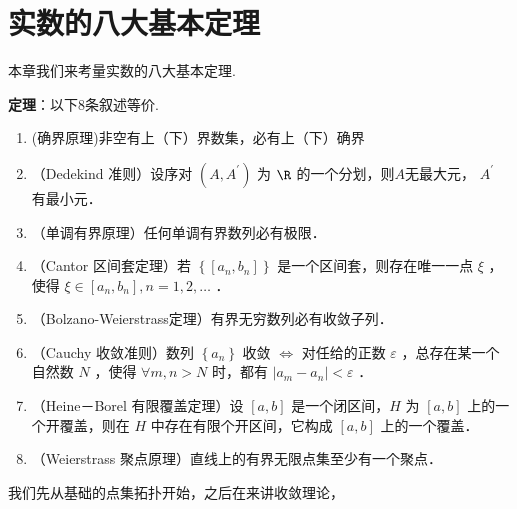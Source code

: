 \chapter{实数的八大基本定理}
本章我们来考量实数的八大基本定理.

\textbf{定理}：以下8条叙述等价.

\begin{enumerate}
	\item (确界原理)非空有上（下）界数集，必有上（下）确界
	\item （Dedekind 准则）设序对 $(A, A^{\prime})$ 为 $\R$ 的一个分划，则$A$无最大元， $A^{\prime}$ 有最小元．
	\item （单调有界原理）任何单调有界数列必有极限．
	\item （Cantor 区间套定理）若 $\left\{\left[a_n, b_n\right]\right\}$ 是一个区间套，则存在唯一一点 $\xi$ ，使得 $\xi \in\left[a_n, b_n\right], n=1,2, \ldots$ ．
	\item （Bolzano-Weierstrass定理）有界无穷数列必有收敛子列．
	\item （Cauchy 收敛准则）数列 $\left\{a_n\right\}$ 收敛 $\Leftrightarrow$ 对任给的正数 $\varepsilon$ ，总存在某一个自然数 $N$ ，使得 $\forall m, n>N$ 时，都有 $\left|a_m-a_n\right|<\varepsilon$ ．
	
	\item （Heine－Borel 有限覆盖定理）设 $[a, b]$ 是一个闭区间，$H$ 为 $[a, b]$ 上的一个开覆盖，则在 $H$ 中存在有限个开区间，它构成 $[a, b]$ 上的一个覆盖．
	\item （Weierstrass 聚点原理）直线上的有界无限点集至少有一个聚点．
\end{enumerate}

我们先从基础的点集拓扑开始，之后在来讲收敛理论，


